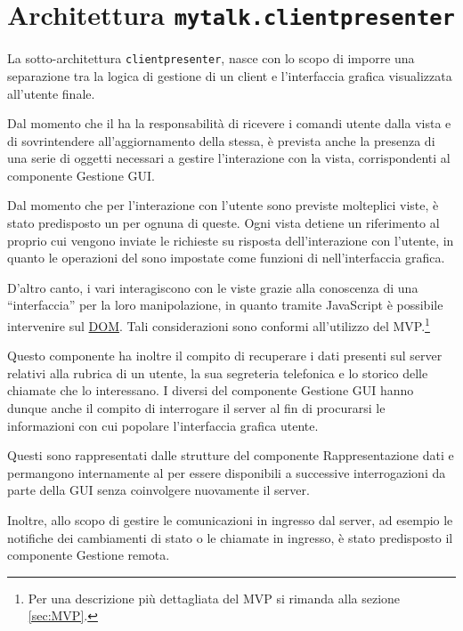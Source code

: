 \section{Architettura \texttt{mytalk.clientpresenter}}\label{sec:clientpresenter}
La sotto-architettura \texttt{clientpresenter}, nasce con lo scopo di imporre una separazione tra la logica di gestione di un client e l'interfaccia grafica visualizzata all'utente finale.

Dal momento che il  ha la responsabilità di ricevere i comandi utente dalla vista e di sovrintendere all'aggiornamento della stessa, è prevista anche la presenza di una serie di oggetti necessari a gestire l'interazione con la vista, corrispondenti al componente \textsf{Gestione GUI}.

Dal momento che per l'interazione con l'utente sono previste molteplici viste, è stato predisposto un  per ognuna di queste. Ogni vista detiene un riferimento al proprio  cui vengono inviate le richieste su risposta dell'interazione con l'utente, in quanto le operazioni del  sono impostate come funzioni di  nell'interfaccia grafica.

D'altro canto, i vari  interagiscono con le viste grazie alla conoscenza di una ``interfaccia'' per la loro manipolazione, in quanto tramite JavaScript è possibile intervenire sul \underline{DOM}\@. Tali considerazioni sono conformi all'utilizzo del  MVP.\footnote{%
  Per una descrizione più dettagliata del  MVP si rimanda alla sezione \ref{sec:MVP}\@.
}

Questo componente ha inoltre il compito di recuperare i dati presenti sul server relativi alla rubrica di un utente, la sua segreteria telefonica e lo storico delle chiamate che lo interessano. I diversi  del componente \textsf{Gestione GUI} hanno dunque anche il compito di interrogare il server al fin di procurarsi le informazioni con cui popolare l'interfaccia grafica utente.

Questi sono rappresentati dalle strutture del componente \textsf{Rappresentazione dati} e permangono internamente al  per essere disponibili a successive interrogazioni da parte della GUI senza coinvolgere nuovamente il server.

Inoltre, allo scopo di gestire le comunicazioni in ingresso dal server, ad esempio le notifiche dei cambiamenti di stato o le chiamate in ingresso, è stato predisposto il componente \textsf{Gestione remota}.

